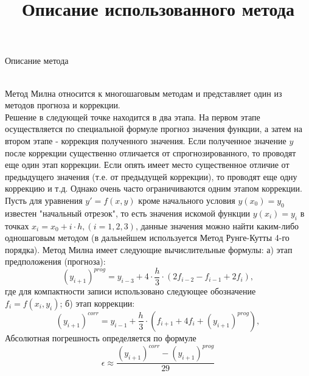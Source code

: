 \newpage

\title{Описание использованного метода}{\begin{center}
    Описание метода
\end{center}} \\

Метод Милна относится к многошаговым методам и представляет один из методов прогноза и коррекции. \\
Решение в следующей точке находится в два этапа. На первом этапе осуществляется по специальной формуле прогноз значения функции, а затем на втором этапе - коррекция полученного значения. Если полученное значение $y $ после коррекции существенно отличается от спрогнозированного, то проводят еще один этап коррекции. Если опять имеет место существенное отличие от предыдущего значения (т.е. от предыдущей коррекции), то проводят еще одну коррекцию и т.д. Однако очень часто ограничиваются одним этапом коррекции. \\
Пусть для уравнения $y' = f(x,y)$ кроме начального условия $y(x_0) = y_0$ известен "начальный отрезок", то есть значения искомой функции $y(x_i) = y_i$ в точках $x_i = x_0 + i\cdot h, (i = 1,2,3)$, данные значения можно найти каким-либо одношаговым методом (в дальнейшем используется Метод Рунге-Кутты 4-го порядка).
\newline
\newline
Метод Милна имеет следующие вычислительные формулы: 
\newline
а) этап предположения (прогноза):
$$(y_{i+1})^{prog} = y_{i-3}+4\cdot\frac{h}{3}\cdot(2f_{i-2}-f_{i-1}+2f_i),$$
где для компактности записи использовано следующее обозначение $f_i = f(x_i, y_i)$;
\newline
б) этап коррекции:
$$(y_{i+1})^{corr} = y_{i-1}+\frac{h}{3}\cdot(f_{i+1}+4f_{i}+(y_{i+1})^{prog}),$$
Абсолютная погрешность определяется по формуле
$$\epsilon \approx \frac{(y_{i+1})^{corr}-(y_{i+1})^{prog}}{29}$$
